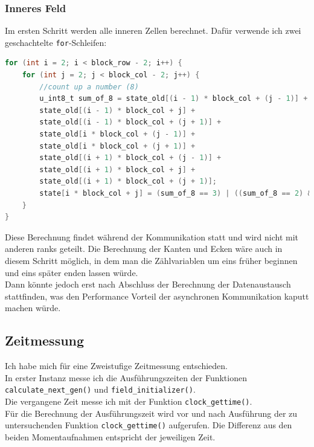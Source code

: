 \documentclass[german,plainarticle,hyperref,utf8]{zihpub}
\begin{document}
	\subsubsection{Inneres Feld}
	Im ersten Schritt werden alle inneren Zellen berechnet. Dafür verwende ich zwei geschachtelte \texttt{for}-Schleifen:\\
	\begin{lstlisting}[language=C, caption=Berechnung der inneren Zellen]
for (int i = 2; i < block_row - 2; i++) {
	for (int j = 2; j < block_col - 2; j++) {
		//count up a number (8)
		u_int8_t sum_of_8 = state_old[(i - 1) * block_col + (j - 1)] +
		state_old[(i - 1) * block_col + j] +
		state_old[(i - 1) * block_col + (j + 1)] +
		state_old[i * block_col + (j - 1)] +
		state_old[i * block_col + (j + 1)] +
		state_old[(i + 1) * block_col + (j - 1)] +
		state_old[(i + 1) * block_col + j] +
		state_old[(i + 1) * block_col + (j + 1)];
		state[i * block_col + j] = (sum_of_8 == 3) | ((sum_of_8 == 2) & state_old[i * block_col + j]);
	}
}\end{lstlisting}

	Diese Berechnung findet während der Kommunikation statt und wird nicht mit anderen ranks geteilt. Die Berechnung der Kanten und Ecken wäre auch in diesem Schritt möglich, in dem man die Zählvariablen um eins früher beginnen und eins später enden lassen würde.\\
	Dann könnte jedoch erst nach Abschluss der Berechnung der Datenaustausch stattfinden, was den Performance Vorteil der asynchronen Kommunikation kaputt machen würde.

	\subsection{Zeitmessung}
	Ich habe mich für eine Zweistufige Zeitmessung entschieden.\\
	
	In erster Instanz messe ich die Ausführungszeiten der Funktionen \texttt{calculate\_next\_gen()} und \texttt{field\_initializer()}.\\
	Die vergangene Zeit messe ich mit der Funktion \texttt{clock\_gettime()}.\\
	Für die Berechnung der Ausführungszeit wird vor und nach Ausführung der zu untersuchenden Funktion \texttt{clock\_gettime()} aufgerufen. Die Differenz aus den beiden Momentaufnahmen entspricht der jeweiligen Zeit.\\
	
\end{document}

